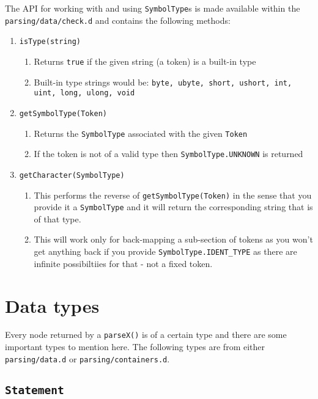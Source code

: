 The API for working with and using \texttt{SymbolType}s is made available
within the \texttt{parsing/data/check.d} and contains the following
methods:
\begin{enumerate}
\item \texttt{isType(string)}
\begin{enumerate}
\item Returns \texttt{true} if the given string (a token) is a built-in
type
\item Built-in type strings would be: \texttt{byte, ubyte, short, ushort, int, uint, long, ulong, void}
\end{enumerate}
\item \texttt{getSymbolType(Token)}
\begin{enumerate}
\item Returns the \texttt{SymbolType} associated with the given \texttt{Token}
\item If the token is not of a valid type then \texttt{SymbolType.UNKNOWN}
is returned
\end{enumerate}
\item \texttt{getCharacter(SymbolType)}
\begin{enumerate}
\item This performs the reverse of \texttt{getSymbolType(Token)} in the
sense that you provide it a \texttt{SymbolType} and it will return
the corresponding string that is of that type.
\item This will work only for back-mapping a sub-section of tokens as you
won't get anything back if you provide \texttt{SymbolType.IDENT\_TYPE}
as there are infinite possibiltiies for that - not a fixed token.
\end{enumerate}
\end{enumerate}

\section{Data types}

Every node returned by a \texttt{parseX()} is of a certain type and
there are some important types to mention here. The following types
are from either \texttt{parsing/data.d} or \texttt{parsing/containers.d}.

\subsection{\texttt{Statement}}

